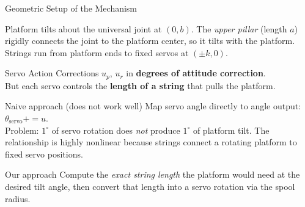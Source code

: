 \documentclass[10pt]{beamer}
\begin{document}
\begin{frame}{Geometric Setup of the Mechanism}
\begin{center}
{%
  }
  \end{center}
  \vspace{0.1cm}
  \scriptsize
  Platform tilts about the universal joint at $(0,b)$. The \emph{upper pillar} (length $a$) rigidly connects the joint to the platform center, so it tilts with the platform. Strings run from platform ends to fixed servos at $(\pm k, 0)$.
\end{frame}


\begin{frame}{Servo Action}
  Corrections $u_p$, $u_r$ in \textbf{degrees of attitude correction}.\\
  But each servo controls the \textbf{length of a string} that pulls the platform.

  \begin{block}{Naive approach (does not work well)}
    Map servo angle directly to angle output: $\theta_{\text{servo}} += u$.\\
    Problem: $1^\circ$ of servo rotation does \emph{not} produce $1^\circ$ of platform tilt.
    The relationship is highly nonlinear because strings connect a rotating platform to fixed servo positions.
  \end{block}

  \begin{block}{Our approach}
    Compute the \emph{exact string length} the platform would need at the desired tilt angle, then convert that length into a servo rotation via the spool radius.
  \end{block}
\end{frame}
\end{document}
